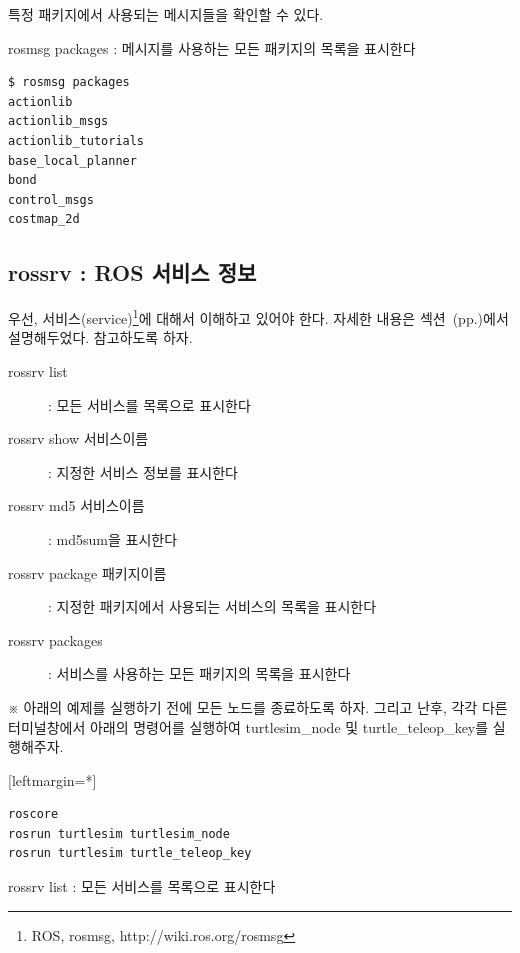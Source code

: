 \noindent
특정 패키지에서 사용되는 메시지들을 확인할 수 있다.

\vspace{\baselineskip}
\noindent
{}\circled{\thenum} rosmsg packages : 메시지를 사용하는 모든 패키지의 목록을 표시한다

\begin{lstlisting}[language=ROS]
$ rosmsg packages
actionlib
actionlib_msgs
actionlib_tutorials
base_local_planner
bond
control_msgs
costmap_2d
\end{lstlisting}

\subsection{rossrv : ROS 서비스 정보}

우선, 서비스(service)\footnote{ROS, rosmsg, http://wiki.ros.org/rosmsg}에 대해서 이해하고 있어야 한다. 자세한 내용은 섹션~(pp.\pageref{def:RosService})에서 설명해두었다. 참고하도록 하자.

\vspace{\baselineskip}
\noindent
\begin{description}
\item[rossrv list] : 모든 서비스를 목록으로 표시한다
\item[rossrv show 서비스이름] : 지정한 서비스 정보를 표시한다
\item[rossrv md5 서비스이름] : md5sum을 표시한다
\item[rossrv package 패키지이름] : 지정한 패키지에서 사용되는 서비스의 목록을 표시한다
\item[rossrv packages] : 서비스를 사용하는 모든 패키지의 목록을 표시한다
\end{description}

\vspace{\baselineskip}
\noindent
※ 아래의 예제를 실행하기 전에 모든 노드를 종료하도록 하자. 그리고 난후, 각각 다른 터미널창에서 아래의 명령어를 실행하여 turtlesim\_node 및 turtle\_teleop\_key를 실행해주자.

[leftmargin=*]
\begin{lstlisting}[language=ROS]
roscore
rosrun turtlesim turtlesim_node 
rosrun turtlesim turtle_teleop_key
\end{lstlisting}

\setcounter{num}{0}

\vspace{\baselineskip}
\noindent
{}\circled{\thenum} rossrv list : 모든 서비스를 목록으로 표시한다

